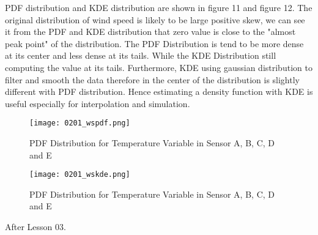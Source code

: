 \documentclass[a4paper,12pt]{article} %
\begin{document}
\begin{enumerate}
PDF distribution and KDE distribution are shown in figure 11 and figure 12. The original distribution of wind speed is likely to be large positive skew, we can see it from the PDF and KDE distribution that zero value is close to the "almost peak point" of the distribution. The PDF Distribution is tend to be more dense at its center and less dense at its tails. While the KDE Distribution still computing the value at its tails. Furthermore, KDE using gaussian distribution to filter and smooth the data therefore in the center of the distribution is slightly different with PDF distribution. Hence estimating a density function with KDE is useful especially for interpolation and simulation.

\setlength{\belowcaptionskip}{-10pt}
\begin{figure}[H]
    \centering
    \texttt{[image: 0201\_wspdf.png]}
    \caption{PDF Distribution for Temperature Variable in Sensor A, B, C, D and E}
    \label{fig:my_label}
\end{figure}

\setlength{\belowcaptionskip}{-10pt}
\begin{figure}[H]
    \centering
    \texttt{[image: 0201\_wskde.png]}
    \caption{PDF Distribution for Temperature Variable in Sensor A, B, C, D and E}
    \label{fig:my_label}
\end{figure}

\end{enumerate}

\begin{flushleft}
\Large{After Lesson 03.}
\end{flushleft}
\end{document}
